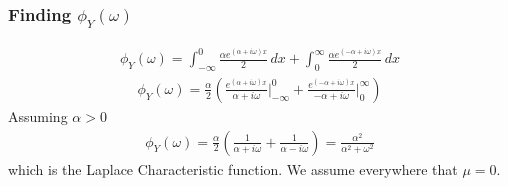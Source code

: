 \documentclass{beamer}
\begin{document}
\begin{frame}
	\frametitle{Finding $\phi_Y(\omega)$}
	\begin{align}
		\phi_Y(\omega) = \int_{-\infty}^{0} \frac{\alpha e^{(\alpha + i\omega)x}}{2} \,dx + \int_{0}^{\infty} \frac{\alpha e^{(-\alpha + i\omega)x}}{2} \,dx
	\end{align}
	\begin{align}
		\phi_Y(\omega) = \frac{\alpha}{2} (\frac{e^{(\alpha + i\omega)x}}{\alpha + i\omega} \big|_{-\infty}^{0} + \frac{e^{(-\alpha + i\omega)x}}{-\alpha + i\omega} \big|_{0}^{\infty}) 
	\end{align}
	Assuming $\alpha > 0$
	\begin{align}
		\phi_Y(\omega) = \frac{\alpha}{2} (\frac{1}{\alpha + i\omega} + \frac{1}{\alpha - i\omega}) = \frac{\alpha^2}{\alpha^2 + \omega^2}
		\label{eq:LapChar}
	\end{align}
	which is the Laplace Characteristic function. We assume everywhere that $\mu = 0$.
\end{frame}
\end{document}
